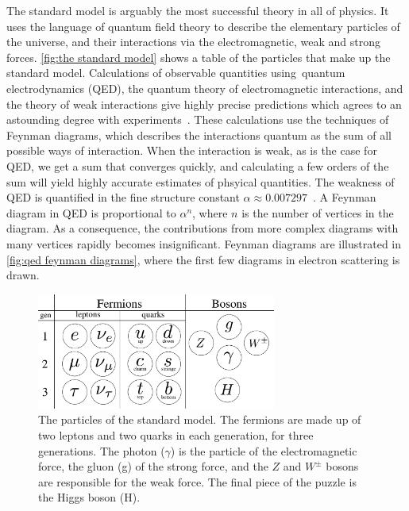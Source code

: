 The standard model is arguably the most successful theory in all of physics.
It uses the language of quantum field theory to describe the elementary particles of the universe, and their interactions via the electromagnetic, weak and strong forces.
\autoref{fig:the standard model} shows a table of the particles that make up the standard model.
Calculations of observable quantities using quantum electrodynamics (QED), the quantum theory of electromagnetic interactions, and the theory of weak interactions give highly precise predictions which agrees to an astounding degree with experiments~\cite{Schwartz:QFT}.
These calculations use the techniques of Feynman diagrams, which describes the interactions quantum as the sum of all possible ways of interaction.
When the interaction is weak, as is the case for QED, we get a sum that converges quickly, and calculating a few orders of the sum will yield highly accurate estimates of phsyical quantities.
The weakness of QED is quantified in the fine structure constant $\alpha \approx 0.00 7297$~\cite{PDG}.
A Feynman diagram in QED is proportional to $\alpha^n$, where $n$ is the number of vertices in the diagram.
As a consequence, the contributions from more complex diagrams with many vertices rapidly becomes insignificant.
Feynman diagrams are illustrated in \autoref{fig:qed feynman diagrams}, where the first few diagrams in electron scattering is drawn.

\begin{figure}[h]
    \centering
    \includegraphics[width=0.7\textwidth]{figurer/standard_model2.pdf}
    \caption{The particles of the standard model. The fermions are made up of two leptons and two quarks in each generation, for three generations. The photon ($\gamma$) is the particle of the electromagnetic force, the gluon (g) of the strong force, and the $Z$ and $W^\pm$ bosons are responsible for the weak force. The final piece of the puzzle is the Higgs boson (H).}
    \label{fig:the standard model}
\end{figure}

